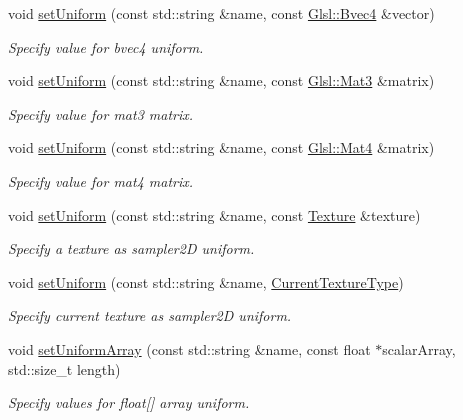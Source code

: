 \begin{DoxyCompactItemize}
void \mbox{\hyperlink{classsf_1_1_shader_ac8db3e0adf1129abf24f0a51a7ec36f4}{set\+Uniform}} (const std\+::string \&name, const \mbox{\hyperlink{structsf_1_1priv_1_1_vector4}{Glsl\+::\+Bvec4}} \&vector)
\begin{DoxyCompactList}\small\item\em Specify value for {\ttfamily bvec4} uniform. \end{DoxyCompactList}\item 
void \mbox{\hyperlink{classsf_1_1_shader_ac1198ae0152d439bc05781046883e281}{set\+Uniform}} (const std\+::string \&name, const \mbox{\hyperlink{structsf_1_1priv_1_1_matrix}{Glsl\+::\+Mat3}} \&matrix)
\begin{DoxyCompactList}\small\item\em Specify value for {\ttfamily mat3} matrix. \end{DoxyCompactList}\item 
void \mbox{\hyperlink{classsf_1_1_shader_aca5c55c4a3b23d21e33dbdaab7990755}{set\+Uniform}} (const std\+::string \&name, const \mbox{\hyperlink{structsf_1_1priv_1_1_matrix}{Glsl\+::\+Mat4}} \&matrix)
\begin{DoxyCompactList}\small\item\em Specify value for {\ttfamily mat4} matrix. \end{DoxyCompactList}\item 
void \mbox{\hyperlink{classsf_1_1_shader_a7806a29ffbd0ee9251256a9e7265d479}{set\+Uniform}} (const std\+::string \&name, const \mbox{\hyperlink{classsf_1_1_texture}{Texture}} \&texture)
\begin{DoxyCompactList}\small\item\em Specify a texture as {\ttfamily sampler2D} uniform. \end{DoxyCompactList}\item 
void \mbox{\hyperlink{classsf_1_1_shader_ab18f531e1f726b88fec1cf5a1e6af26d}{set\+Uniform}} (const std\+::string \&name, \mbox{\hyperlink{structsf_1_1_shader_1_1_current_texture_type}{Current\+Texture\+Type}})
\begin{DoxyCompactList}\small\item\em Specify current texture as {\ttfamily sampler2D} uniform. \end{DoxyCompactList}\item 
void \mbox{\hyperlink{classsf_1_1_shader_a731d3b9953c50fe7d3fb03340b97deff}{set\+Uniform\+Array}} (const std\+::string \&name, const float $\ast$scalar\+Array, std\+::size\+\_\+t length)
\begin{DoxyCompactList}\small\item\em Specify values for {\ttfamily float}\mbox{[}\mbox{]} array uniform. \end{DoxyCompactList}\item 

\end{DoxyCompactItemize}
